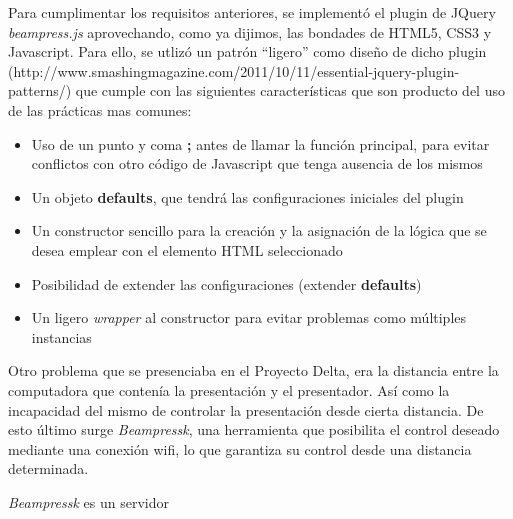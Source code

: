 	Para cumplimentar los requisitos anteriores, se implementó el plugin de JQuery \textit{beampress.js} aprovechando, como ya dijimos, las bondades de HTML5, CSS3 y Javascript. Para ello, se utlizó un patrón ``ligero'' como diseño de dicho plugin (http://www.smashingmagazine.com/2011/10/11/essential-jquery-plugin-patterns/) que cumple con las siguientes características que son producto del uso de las prácticas mas comunes:

	\begin{itemize}
		\item Uso de un punto y coma \textbf{;} antes de llamar la función principal, para evitar conflictos con otro código de Javascript que tenga ausencia de los mismos
		\item Un objeto \textbf{defaults}, que tendrá las configuraciones iniciales del plugin
		\item Un constructor sencillo para la creación y la asignación de la lógica que se desea emplear con el elemento HTML seleccionado
		\item Posibilidad de extender las configuraciones (extender \textbf{defaults})
		\item Un ligero \textit{wrapper} al constructor para evitar problemas como múltiples instancias
	\end{itemize}

	Otro problema que se presenciaba en el Proyecto Delta, era la distancia entre la computadora que contenía la presentación y el presentador. Así como la incapacidad del mismo de controlar la presentación desde cierta distancia. De esto último surge \textit{Beampressk}, una herramienta que posibilita el control deseado mediante una conexión wifi, lo que garantiza su control desde una distancia determinada.

	\textit{Beampressk} es un servidor


